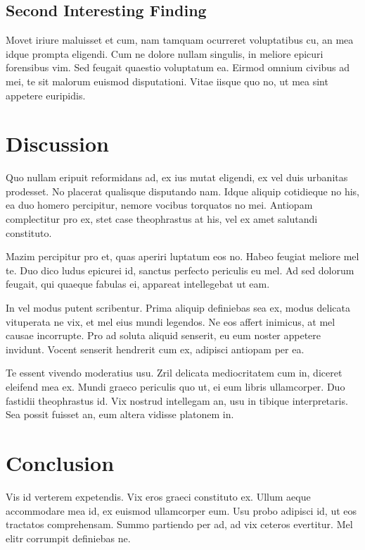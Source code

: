 \documentclass[letterpaper]{article}
\begin{document}
\subsection{Second Interesting Finding}
Movet iriure maluisset et cum, nam tamquam ocurreret voluptatibus cu, an mea idque prompta eligendi. Cum ne dolore nullam singulis, in meliore epicuri forensibus vim. Sed feugait quaestio voluptatum ea. Eirmod omnium civibus ad mei, te sit malorum euismod disputationi. Vitae iisque quo no, ut mea sint appetere euripidis.

\section{Discussion}
Quo nullam eripuit reformidans ad, ex ius mutat eligendi, ex vel duis urbanitas prodesset. No placerat qualisque disputando nam. Idque aliquip cotidieque no his, ea duo homero percipitur, nemore vocibus torquatos no mei. Antiopam complectitur pro ex, stet case theophrastus at his, vel ex amet salutandi constituto.

Mazim percipitur pro et, quas aperiri luptatum eos no. Habeo feugiat meliore mel te. Duo dico ludus epicurei id, sanctus perfecto periculis eu mel. Ad sed dolorum feugait, qui quaeque fabulas ei, appareat intellegebat ut eam.

In vel modus putent scribentur. Prima aliquip definiebas sea ex, modus delicata vituperata ne vix, et mel eius mundi legendos. Ne eos affert inimicus, at mel causae incorrupte. Pro ad soluta aliquid senserit, eu eum noster appetere invidunt. Vocent senserit hendrerit cum ex, adipisci antiopam per ea.

Te essent vivendo moderatius usu. Zril delicata mediocritatem cum in, diceret eleifend mea ex. Mundi graeco periculis quo ut, ei eum libris ullamcorper. Duo fastidii theophrastus id. Vix nostrud intellegam an, usu in tibique interpretaris. Sea possit fuisset an, eum altera vidisse platonem in.

\section{Conclusion}
Vis id verterem expetendis. Vix eros graeci constituto ex. Ullum aeque accommodare mea id, ex euismod ullamcorper eum. Usu probo adipisci id, ut eos tractatos comprehensam. Summo partiendo per ad, ad vix ceteros evertitur. Mel elitr corrumpit definiebas ne.

%
%

\printbibliography
\end{document}
